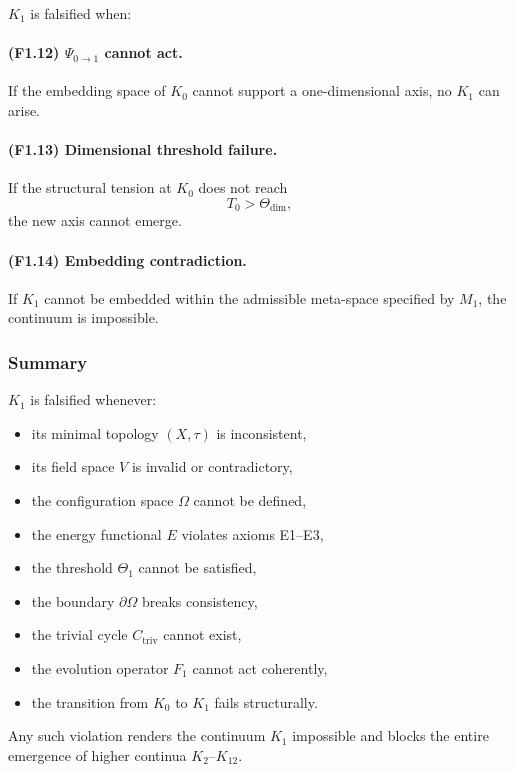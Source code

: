 $K_1$ is falsified when:

\paragraph{(F1.12) $\Psi_{0\to 1}$ cannot act.}
If the embedding space of $K_0$ cannot support a one-dimensional axis,
no $K_1$ can arise.

\paragraph{(F1.13) Dimensional threshold failure.}
If the structural tension at $K_0$ does not reach
\[
T_0 > \Theta_{\mathrm{dim}},
\]
the new axis cannot emerge.

\paragraph{(F1.14) Embedding contradiction.}
If $K_1$ cannot be embedded within the admissible meta-space specified by
$M_1$, the continuum is impossible.



\subsubsection{Summary}

$K_1$ is falsified whenever:

\begin{itemize}
    \item its minimal topology $(X,\tau)$ is inconsistent,
    \item its field space $V$ is invalid or contradictory,
    \item the configuration space $\Omega$ cannot be defined,
    \item the energy functional $E$ violates axioms E1–E3,
    \item the threshold $\Theta_1$ cannot be satisfied,
    \item the boundary $\partial\Omega$ breaks consistency,
    \item the trivial cycle $C_{\mathrm{triv}}$ cannot exist,
    \item the evolution operator $F_1$ cannot act coherently,
    \item the transition from $K_0$ to $K_1$ fails structurally.
\end{itemize}

Any such violation renders the continuum $K_1$ impossible and blocks the
entire emergence of higher continua $K_2$–$K_{12}$.
